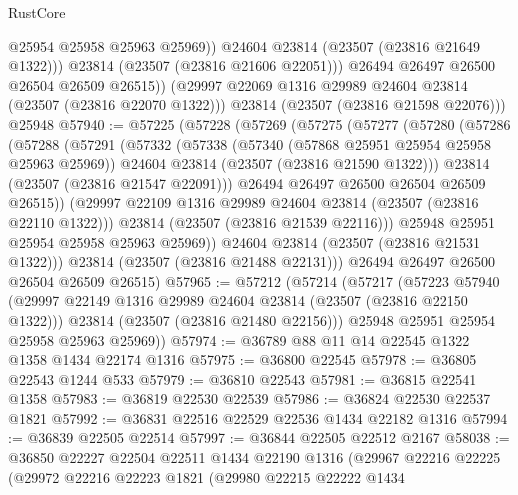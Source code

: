 \begin{lexlean}{RustCore}
\begin{coremodule}
                  @25954
                  @25958
                  @25963
                  @25969))
              @24604
              @23814
              (@23507 (@23816 @21649 @1322)))
            @23814
            (@23507 (@23816 @21606 @22051)))
          @26494
          @26497
          @26500
          @26504
          @26509
          @26515))
      (@29997 @22069 @1316 @29989 @24604 @23814 (@23507 (@23816 @22070 @1322)))
      @23814
      (@23507 (@23816 @21598 @22076)))
    @25948
@57940 := @57225
    (@57228
      (@57269
        (@57275
          (@57277
            (@57280
              (@57286
                (@57288
                  (@57291
                    (@57332
                      (@57338
                        (@57340 (@57868 @25951 @25954 @25958 @25963 @25969))
                        @24604
                        @23814
                        (@23507 (@23816 @21590 @1322)))
                      @23814
                      (@23507 (@23816 @21547 @22091)))
                    @26494
                    @26497
                    @26500
                    @26504
                    @26509
                    @26515))
                (@29997 @22109 @1316 @29989 @24604 @23814 (@23507 (@23816 @22110 @1322)))
                @23814
                (@23507 (@23816 @21539 @22116)))
              @25948
              @25951
              @25954
              @25958
              @25963
              @25969))
          @24604
          @23814
          (@23507 (@23816 @21531 @1322)))
        @23814
        (@23507 (@23816 @21488 @22131)))
      @26494
      @26497
      @26500
      @26504
      @26509
      @26515)
@57965 := @57212
    (@57214
      (@57217
        (@57223
          @57940
          (@29997 @22149 @1316 @29989 @24604 @23814 (@23507 (@23816 @22150 @1322)))
          @23814
          (@23507 (@23816 @21480 @22156)))
        @25948
        @25951
        @25954
        @25958
        @25963
        @25969))
@57974 := @36789 @88 @11 @14 @22545 @1322 @1358 @1434 @22174 @1316
@57975 := @36800 @22545
@57978 := @36805 @22543 @1244 @533
@57979 := @36810 @22543
@57981 := @36815 @22541 @1358
@57983 := @36819 @22530 @22539
@57986 := @36824 @22530 @22537 @1821
@57992 := @36831 @22516 @22529 @22536 @1434 @22182 @1316
@57994 := @36839 @22505 @22514
@57997 := @36844 @22505 @22512 @2167
@58038 := @36850
    @22227
    @22504
    @22511
    @1434
    @22190
    @1316
    (@29967
      @22216
      @22225
      (@29972
        @22216
        @22223
        @1821
        (@29980
          @22215
          @22222
          @1434

\end{coremodule}
\end{lexlean}
